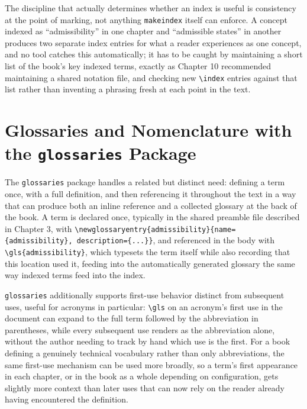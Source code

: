 The discipline that actually determines whether an index is useful is consistency at the point of marking, not anything \texttt{makeindex} itself can enforce. A concept indexed as ``admissibility'' in one chapter and ``admissible states'' in another produces two separate index entries for what a reader experiences as one concept, and no tool catches this automatically; it has to be caught by maintaining a short list of the book's key indexed terms, exactly as Chapter 10 recommended maintaining a shared notation file, and checking new \texttt{\textbackslash{}index} entries against that list rather than inventing a phrasing fresh at each point in the text.

\hypertarget{glossaries-and-nomenclature-with-the-glossaries-package}{%
\section{\texorpdfstring{Glossaries and Nomenclature with the \texttt{glossaries} Package}{Glossaries and Nomenclature with the glossaries Package}}\label{glossaries-and-nomenclature-with-the-glossaries-package}}

The \texttt{glossaries} package handles a related but distinct need: defining a term once, with a full definition, and then referencing it throughout the text in a way that can produce both an inline reference and a collected glossary at the back of the book. A term is declared once, typically in the shared preamble file described in Chapter 3, with \texttt{\textbackslash{}newglossaryentry\{admissibility\}\{name=\{admissibility\},\ description=\{...\}\}}, and referenced in the body with \texttt{\textbackslash{}gls\{admissibility\}}, which typesets the term itself while also recording that this location used it, feeding into the automatically generated glossary the same way indexed terms feed into the index.

\texttt{glossaries} additionally supports first-use behavior distinct from subsequent uses, useful for acronyms in particular: \texttt{\textbackslash{}gls} on an acronym's first use in the document can expand to the full term followed by the abbreviation in parentheses, while every subsequent use renders as the abbreviation alone, without the author needing to track by hand which use is the first. For a book defining a genuinely technical vocabulary rather than only abbreviations, the same first-use mechanism can be used more broadly, so a term's first appearance in each chapter, or in the book as a whole depending on configuration, gets slightly more context than later uses that can now rely on the reader already having encountered the definition.

